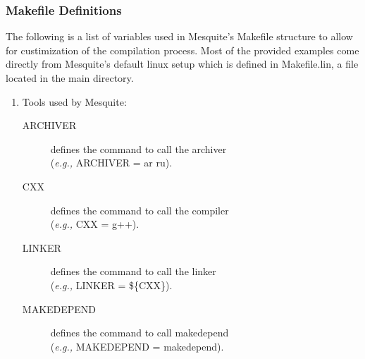 \subsubsection{Makefile Definitions}
The following is a list of variables used in Mesquite's Makefile
structure to allow for custimization of the compilation process.
Most of the provided examples come directly from Mesquite's default
linux setup which is defined in Makefile.lin, a file located in
the main directory.
\label{mes_vars_and_defs}
\begin{enumerate}

\item Tools used by Mesquite:
  \begin{description}
  \item[ARCHIVER] defines the command to call the archiver\\
    	({\it e.g.,} ARCHIVER = ar ru).
  \item[CXX] defines the command to call the compiler\\
	({\it e.g.,} CXX = g++).
  \item [LINKER] defines the command to call the linker\\
	({\it e.g.,} LINKER = \$\{CXX\}).
  \item[MAKEDEPEND] defines the command to call makedepend\\
	({\it e.g.,} MAKEDEPEND = makedepend).
  \end{description}


\end{enumerate}
